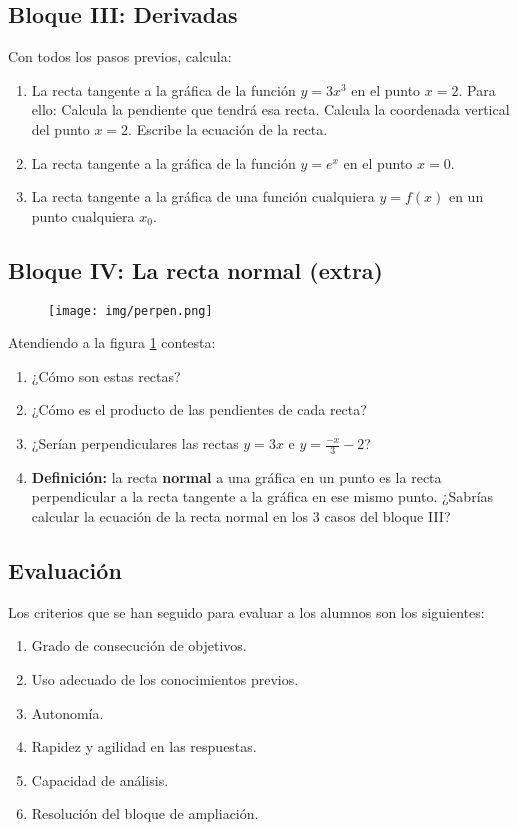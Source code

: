 \documentclass[palatino,nobuilddate,nochap]{apuntesURJC}
\begin{document}
\subsection{Bloque III: Derivadas}

Con todos los pasos previos, calcula:

\begin{enumerate}
	\item La recta tangente a la gráfica de la función $y=3x^3$ en el punto $x=2$. Para ello:
	\subitem Calcula la pendiente que tendrá esa recta.
	\subitem Calcula la coordenada vertical del punto $x=2$.
	\subitem Escribe la ecuación de la recta.
	\vspace{2cm}
	\item La recta tangente a la gráfica de la función $y=e^x$ en el punto $x=0$.
	\item La recta tangente a la gráfica de una función cualquiera $y=f(x)$ en un punto cualquiera $x_0$.
\end{enumerate}
\newpage
\subsection{Bloque IV: La recta normal (extra)}

\begin{figure}[hbtp]
\centering
\texttt{[image: img/perpen.png]}
\caption{}
\label{img:perpen}
\end{figure}


Atendiendo a la figura \ref{img:perpen} contesta:
\begin{enumerate}
	\item ¿Cómo son estas rectas?
	\item ¿Cómo es el producto de las pendientes de cada recta?
	\item ¿Serían perpendiculares las rectas $y=3x$ e $y=\frac{-x}{3}-2$?
	\item \textbf{Definición:} la recta \textbf{normal} a una gráfica en un punto es la recta perpendicular a la recta tangente a la gráfica en ese mismo punto.
	\subitem ¿Sabrías calcular la ecuación de la recta normal en los 3 casos del bloque III?
\end{enumerate}

\newpage
\subsection{Evaluación}
Los criterios que se han seguido para evaluar a los alumnos son los siguientes:
\begin{enumerate}
	\item Grado de consecución de objetivos.
	\item Uso adecuado de los conocimientos previos.
	\item Autonomía.
	\item Rapidez y agilidad en las respuestas.
	\item Capacidad de análisis.
	\item Resolución del bloque de ampliación.
\end{enumerate}



\printindex
\end{document}
